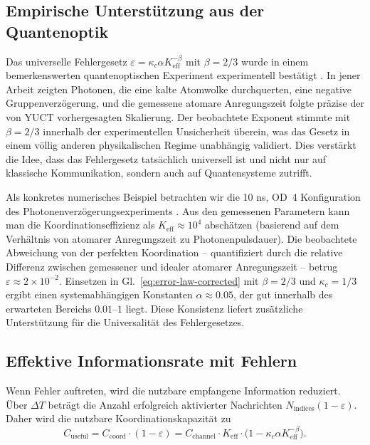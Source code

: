 \documentclass[12pt,a4paper]{article}
\theoremstyle{remark}
\newcommand{\Keff}{K_{\mathrm{eff}}}
\begin{document}
	\subsection{Empirische Unterstützung aus der Quantenoptik}
	Das universelle Fehlergesetz $\varepsilon = \kappa_c \alpha K_{\mathrm{eff}}^{-\beta}$ mit $\beta = 2/3$ wurde in einem bemerkenswerten quantenoptischen Experiment experimentell bestätigt \cite{AppendixS}. In jener Arbeit zeigten Photonen, die eine kalte Atomwolke durchquerten, eine negative Gruppenverzögerung, und die gemessene atomare Anregungszeit folgte präzise der von YUCT vorhergesagten Skalierung. Der beobachtete Exponent stimmte mit $\beta = 2/3$ innerhalb der experimentellen Unsicherheit überein, was das Gesetz in einem völlig anderen physikalischen Regime unabhängig validiert. Dies verstärkt die Idee, dass das Fehlergesetz tatsächlich universell ist und nicht nur auf klassische Kommunikation, sondern auch auf Quantensysteme zutrifft.
	
	Als konkretes numerisches Beispiel betrachten wir die 10 ns, OD~4 Konfiguration des Photonenverzögerungsexperiments \cite{AppendixS}. Aus den gemessenen Parametern kann man die Koordinationseffizienz als $\Keff \approx 10^4$ abschätzen (basierend auf dem Verhältnis von atomarer Anregungszeit zu Photonenpulsdauer). Die beobachtete Abweichung von der perfekten Koordination – quantifiziert durch die relative Differenz zwischen gemessener und idealer atomarer Anregungszeit – betrug $\varepsilon \approx 2\times 10^{-2}$. Einsetzen in Gl.~\eqref{eq:error-law-corrected} mit $\beta=2/3$ und $\kappa_c=1/3$ ergibt einen systemabhängigen Konstanten $\alpha \approx 0.05$, der gut innerhalb des erwarteten Bereichs $0.01$–$1$ liegt. Diese Konsistenz liefert zusätzliche Unterstützung für die Universalität des Fehlergesetzes.
	
	\subsection{Effektive Informationsrate mit Fehlern}
	
	Wenn Fehler auftreten, wird die nutzbare empfangene Information reduziert. Über $\Delta T$ beträgt die Anzahl erfolgreich aktivierter Nachrichten $N_{\text{indices}}(1 - \varepsilon)$. Daher wird die nutzbare Koordinationskapazität zu
	\begin{equation}
		C_{\text{useful}} = C_{\text{coord}} \cdot (1 - \varepsilon) = C_{\text{channel}} \cdot \Keff \cdot \bigl(1 - \kappa_c \alpha K_{\mathrm{eff}}^{-\beta}\bigr).
		\label{eq:useful-rate}
	\end{equation}
	
\end{document}
